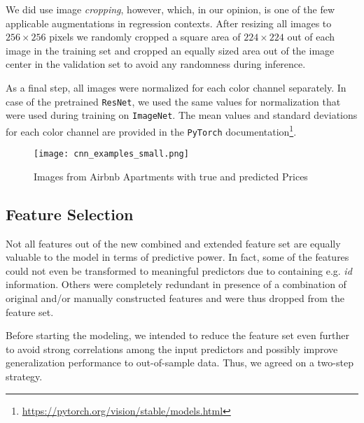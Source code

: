 We did use image \emph{cropping}, however, which, in our opinion, is one of the few applicable augmentations in regression contexts.
After resizing all images to $256 \times 256$ pixels we randomly cropped a square area of $224 \times 224$ out of each image in the training set and cropped an equally sized area out of the image center in the validation set to avoid any randomness during inference.

As a final step, all images were normalized for each color channel separately.
In case of the pretrained \texttt{ResNet}, we used the same values for normalization that were used during training on \texttt{ImageNet}.
The mean values and standard deviations for each color channel are provided in the \texttt{PyTorch} documentation\footnote{\url{https://pytorch.org/vision/stable/models.html}}.

\begin{figure}[t]
  \centering
  \texttt{[image: cnn\_examples\_small.png]}
  \caption{Images from Airbnb Apartments with true and predicted Prices}
  \label{fig:cnn-examples}
\end{figure}

\subsection{Feature Selection} \label{appendix:feature-selection}

Not all features out of the new combined and extended feature set are equally valuable to the model in terms of predictive power.
In fact, some of the features could not even be transformed to meaningful predictors due to containing e.g. \emph{id} information.
Others were completely redundant in presence of a combination of original and/or manually constructed features and were thus dropped from the feature set.

Before starting the modeling, we intended to reduce the feature set even further to avoid strong correlations among the input predictors and possibly improve generalization performance to out-of-sample data.
Thus, we agreed on a two-step strategy.

